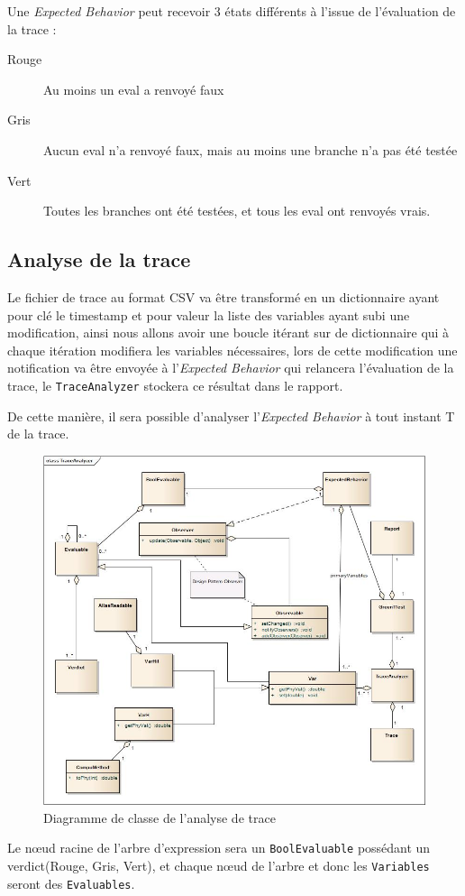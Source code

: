 Une \textit{Expected Behavior} peut recevoir 3 états différents à l'issue de l'évaluation de la trace : 
\begin{description}
	\item[Rouge] Au moins un eval a renvoyé faux
	\item[Gris] Aucun eval n'a renvoyé faux, mais au moins une branche n'a pas été testée
	\item[Vert] Toutes les branches ont été testées, et tous les eval ont renvoyés vrais.
\end{description}

	\subsection{Analyse de la trace}
	Le fichier de trace au format CSV va être transformé en un dictionnaire ayant pour clé le timestamp et pour valeur la liste des variables ayant subi une
	modification, ainsi nous allons avoir une boucle itérant sur de dictionnaire qui à chaque itération modifiera les variables nécessaires, lors de cette modification
	une notification va être envoyée à l'\textit{Expected Behavior} qui relancera l'évaluation de la trace, le \texttt{TraceAnalyzer} stockera ce résultat dans le rapport. 

	De cette manière, il sera possible d'analyser l'\textit{Expected Behavior} à tout instant T de la trace.
	\vfill~\vfill

 	\begin{figure}[H]
 		\centering
 		\includegraphics[width=17.5cm]{contents/images/TraceAnalyzer.jpg}
 		\caption{Diagramme de classe de l'analyse de trace}
 		\label{fig:diagLogique}
 	\end{figure}
 	Le n\oe{}ud racine de l'arbre d'expression sera un \texttt{BoolEvaluable} possédant un verdict(Rouge, Gris, Vert), et chaque n\oe{}ud de l'arbre et donc les \texttt{Variables} seront des \texttt{Evaluables}.
